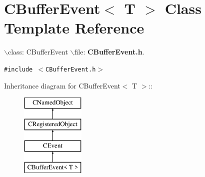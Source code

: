 \section{CBuffer\-Event$<$ T $>$  Class Template Reference}
\label{classCBufferEvent}
$\backslash$class: CBuffer\-Event $\backslash$file: {\bf CBuffer\-Event.h}. 


{\tt \#include $<$CBuffer\-Event.h$>$}

Inheritance diagram for CBuffer\-Event$<$ T $>$::\begin{figure}[H]
\begin{center}
\leavevmode
\includegraphics[height=4cm]{classCBufferEvent}
\end{center}
\end{figure}
